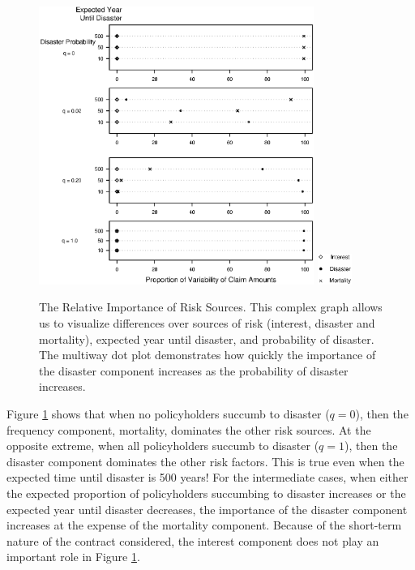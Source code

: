 \begin{figure}[htp]
  \begin{center}
    \includegraphics[width=0.8\textwidth]
        {Chapter21Graphs/Fig21_8MultipleDotPlots.eps}
  \includegraphics[width=0.1\textwidth]
        {Chapter21Graphs/Fig21_8Legend.eps}
    \caption{\label{F21:MultipleDotPlots} \small The Relative Importance of Risk Sources. This complex graph allows
us to visualize differences over sources of risk (interest, disaster
and mortality), expected year until disaster, and probability of
disaster. The multiway dot plot demonstrates how quickly the
importance of the disaster component increases as the probability of
disaster increases.}
  \end{center}
\end{figure}

Figure \ref{F21:MultipleDotPlots} shows that when no policyholders
succumb to disaster ($q = 0$), then the frequency component,
mortality, dominates the other risk sources. At the opposite
extreme, when all policyholders succumb to disaster ($q = 1$), then
the disaster component dominates the other risk factors. This is
true even when the expected time until disaster is 500 years! For
the intermediate cases, when either the expected proportion of
policyholders succumbing to disaster increases or the expected year
until disaster decreases, the importance of the disaster component
increases at the expense of the mortality component. Because of the
short-term nature of the contract considered, the interest component
does not play an important role in Figure
\ref{F21:MultipleDotPlots}.

